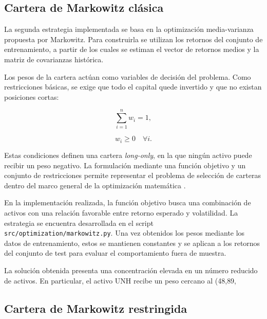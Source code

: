 \subsection{Cartera de Markowitz clásica}

La segunda estrategia implementada se basa en la optimización media-varianza propuesta por Markowitz. Para construirla se utilizan los retornos del conjunto de entrenamiento, a partir de los cuales se estiman el vector de retornos medios y la matriz de covarianzas histórica.

Los pesos de la cartera actúan como variables de decisión del problema. Como restricciones básicas, se exige que todo el capital quede invertido y que no existan posiciones cortas:

\begin{equation}
\sum_{i=1}^{n} w_i = 1,
\end{equation}

\begin{equation}
w_i \geq 0 \quad \forall i.
\end{equation}

Estas condiciones definen una cartera \textit{long-only}, en la que ningún activo puede recibir un peso negativo. La formulación mediante una función objetivo y un conjunto de restricciones permite representar el problema de selección de carteras dentro del marco general de la optimización matemática \cite{boyd2004convex}.

En la implementación realizada, la función objetivo busca una combinación de activos con una relación favorable entre retorno esperado y volatilidad. La estrategia se encuentra desarrollada en el script \texttt{src/optimization/markowitz.py}. Una vez obtenidos los pesos mediante los datos de entrenamiento, estos se mantienen constantes y se aplican a los retornos del conjunto de test para evaluar el comportamiento fuera de muestra.

La solución obtenida presenta una concentración elevada en un número reducido de activos. En particular, el activo UNH recibe un peso cercano al (48{,}89,%

\subsection{Cartera de Markowitz restringida}


